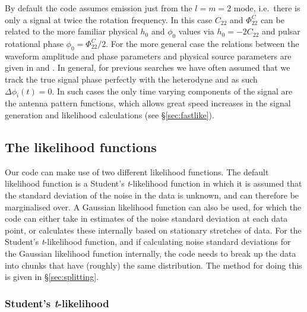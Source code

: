 By default the code assumes emission just from the $l=m=2$ mode, i.e.\ there is only a signal at twice the
rotation frequency. In this case $C_{22}$ and $\Phi_{22}^C$ can be related to the more familiar physical
$h_0$ and $\phi_0$ values via $h_0 = -2C_{22}$ \citep[where the minus sign maintains consistency of equation~\ref{eq:h2f} with the form given in][]{1998PhRvD..58f3001J} and pulsar rotational 
phase $\phi_0 = \Phi_{22}^C/2$. For the more general case the
relations between the waveform amplitude and phase parameters and physical source parameters are given in
\citet{2015arXiv150105832J} and \citet{2015MNRAS.453.4399P}. In general, for previous searches we have often assumed that we track the true
signal phase perfectly with the heterodyne and as such $\Delta\phi_i(t) = 0$. In such cases the only time
varying components of the signal are the antenna pattern functions, which allows great speed increases in the
signal generation and likelihood calculations (see \S\ref{sec:fastlike}).

\subsection{The likelihood functions}\label{sec:likelihood}

Our code can make use of two different likelihood functions. The default likelihood function is a
Student's {\it t}-likelihood function in which it is assumed that the standard deviation of the noise in the
data is unknown, and can therefore be marginalised over. A Gaussian likelihood function can also be used, for
which the code can either take in estimates of the noise standard deviation at each data point, or calculates
these internally based on stationary stretches of data. For the Student's {\it t}-likelihood function, and if
calculating noise standard deviations for the Gaussian likelihood function internally, the code needs to break
up the data into chunks that have (roughly) the same distribution. The method for doing this is given in
\S\ref{sec:splitting}.

\subsubsection{Student's {\it t}-likelihood}\label{sec:stlikelihood}

